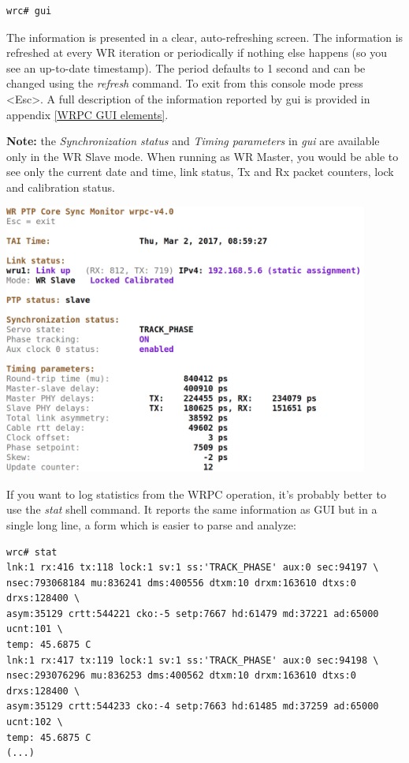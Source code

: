 \documentclass[a4paper, 12pt]{article}
\newcommand{\codeHook}[1]{\mbox{\ttfamily\MakeTextUppercase{#1}}}
\begin{document}
\begin{lstlisting}
wrc# gui
\end{lstlisting}

The information is presented in a clear, auto-refreshing screen. The
information is refreshed at every WR iteration or periodically if
nothing else happens (so you see an up-to-date timestamp). The period
defaults to 1 second and can be changed using the \textit{refresh} command. To exit from
this console mode press <Esc>. A full description of the information reported
by gui is provided in appendix \ref{WRPC GUI elements}.

\noindent\textbf{Note:} the \textit{Synchronization status} and \textit{Timing parameters} in \textit{gui}
are available only in the \codeHook{wr} Slave mode. When running as \codeHook{wr} Master, you
would be able to see only the current date and time, link status, Tx and Rx
packet counters, lock and calibration status.

\vspace{1em}
\includegraphics[width=12cm]{wrpc_mon.png}
\vspace{1em}

If you want to log statistics from the \codeHook{wrpc} operation, it's probably
better to use the \textit{stat} shell command. It reports the same information as GUI
but in a single long line, a form which is easier to parse and analyze:

\begin{lstlisting}
wrc# stat
lnk:1 rx:416 tx:118 lock:1 sv:1 ss:'TRACK_PHASE' aux:0 sec:94197 \
nsec:793068184 mu:836241 dms:400556 dtxm:10 drxm:163610 dtxs:0 drxs:128400 \
asym:35129 crtt:544221 cko:-5 setp:7667 hd:61479 md:37221 ad:65000 ucnt:101 \
temp: 45.6875 C
lnk:1 rx:417 tx:119 lock:1 sv:1 ss:'TRACK_PHASE' aux:0 sec:94198 \
nsec:293076296 mu:836253 dms:400562 dtxm:10 drxm:163610 dtxs:0 drxs:128400 \
asym:35129 crtt:544233 cko:-4 setp:7663 hd:61485 md:37259 ad:65000 ucnt:102 \
temp: 45.6875 C
(...)
\end{lstlisting}
\end{document}
